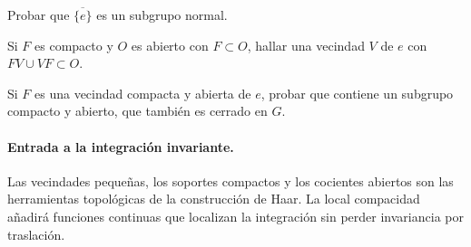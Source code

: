 \begin{ejercicio}\label{ej:v4-l16-7}
Probar que $\overline{\{e\}}$ es un subgrupo normal.
\end{ejercicio}

\begin{ejercicio}\label{ej:v4-l16-8}
Si $F$ es compacto y $O$ es abierto con $F\subset O$, hallar una vecindad $V$ de $e$ con $FV\cup VF\subset O$.
\end{ejercicio}

\begin{ejercicio}\label{ej:v4-l16-9}
Si $F$ es una vecindad compacta y abierta de $e$, probar que contiene un subgrupo compacto y abierto, que también es cerrado en $G$.
\end{ejercicio}


\paragraph{Entrada a la integración invariante.}
Las vecindades pequeñas, los soportes compactos y los cocientes abiertos son las herramientas topológicas de la construcción de Haar. La local compacidad añadirá funciones continuas que localizan la integración sin perder invariancia por traslación.
